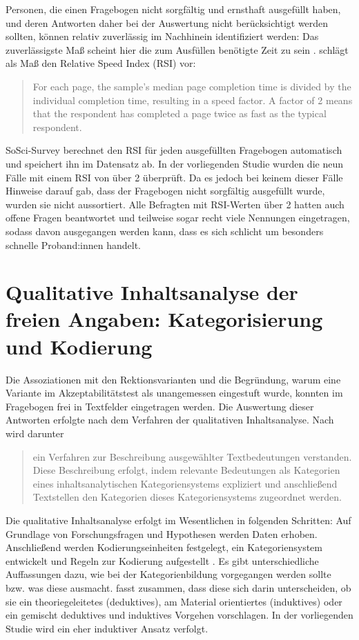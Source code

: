 Personen, die einen Fragebogen nicht sorgfältig und ernsthaft ausgefüllt haben, und deren Antworten daher bei der Auswertung nicht berücksichtigt werden sollten, können relativ zuverlässig im Nachhinein identifiziert werden: Das zuverlässigste Maß scheint hier die zum Ausfüllen benötigte Zeit zu sein \citep[s.][]{Leiner.2019}. \citet{Leiner.2019} schlägt als Maß den Relative Speed Index (RSI) vor: 
\begin{quote} For each page, the sample's median page completion time is divided by the individual completion time, resulting in a speed factor. A factor of 2 means that the respondent has completed a page twice as fast as the typical respondent.~\citep[236]{Leiner.2019} 
\end{quote}
SoSci-Survey berechnet den RSI für jeden ausgefüllten Fragebogen automatisch und speichert ihn im Datensatz ab. In der vorliegenden Studie wurden die neun Fälle mit einem RSI von über 2 überprüft. Da es jedoch bei keinem dieser Fälle Hinweise darauf gab, dass der Fragebogen nicht sorgfältig ausgefüllt wurde, wurden sie nicht aussortiert. Alle Befragten mit RSI-Werten über 2 hatten auch offene Fragen beantwortet und teilweise sogar recht viele Nennungen eingetragen, sodass davon ausgegangen werden kann, dass es sich schlicht um besonders schnelle Proband:innen handelt. 
\section[Qualitative Inhaltsanalyse der freien Angaben]{Qualitative Inhaltsanalyse der freien Angaben: Kategorisierung und Kodierung}
\label{sec:Kategorisierung}
Die Assoziationen mit den Rektionsvarianten und die Begründung, warum eine Variante im Akzeptabilitätstest als unangemessen eingestuft wurde, konnten im Fragebogen frei in Textfelder eingetragen werden. Die Auswertung dieser Antworten erfolgte nach dem Verfahren der qualitativen Inhaltsanalyse. 
Nach \citet[][]{Schreier.2014} wird darunter
\begin{quote}
ein Verfahren zur Beschreibung ausgewählter Textbedeutungen verstanden. Diese Beschreibung erfolgt, indem relevante Bedeutungen als Kategorien eines inhaltsanalytischen Kategoriensystems expliziert und anschließend Textstellen den Kategorien dieses Kategoriensystems zugeordnet werden. \citep[5]{Schreier.2014}
\end{quote} 
Die qualitative Inhaltsanalyse erfolgt im Wesentlichen in folgenden Schritten: Auf Grundlage von Forschungsfragen und Hypothesen werden Daten erhoben. Anschließend werden Kodierungseinheiten festgelegt, ein Kategoriensystem entwickelt und Regeln zur Kodierung aufgestellt \citep[s.][49]{Kuckartz.2014}. Es gibt unterschiedliche Auffassungen dazu, wie bei der Kategorienbildung vorgegangen werden sollte bzw. was diese ausmacht.
\citet[2]{Schreier.2014} fasst zusammen, dass diese sich darin unterscheiden, ob sie ein theoriegeleitetes (deduktives), am Material orientiertes (induktives) oder ein gemischt deduktives und induktives Vorgehen vorschlagen. 
In der vorliegenden Studie wird ein eher induktiver Ansatz verfolgt. 

